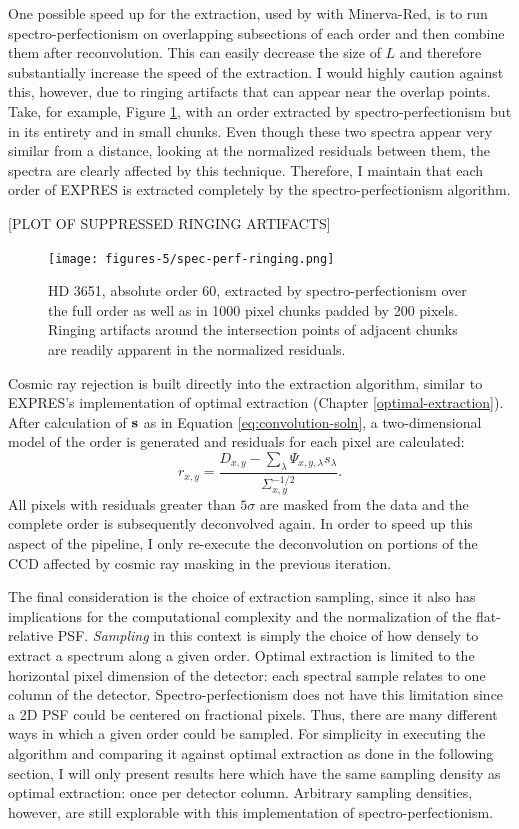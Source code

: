 One possible speed up for the extraction, used by \citet{cornachione_full_2019} with Minerva-Red, is to run spectro-perfectionism on overlapping subsections of each order and then combine them after reconvolution. This can easily decrease the size of $L$ and therefore substantially increase the speed of the extraction. I would highly caution against this, however, due to ringing artifacts that can appear near the overlap points. Take, for example, Figure \ref{fig:spec-perf-ringing}, with an order extracted by spectro-perfectionism but in its entirety and in small chunks. Even though these two spectra appear very similar from a distance, looking at the normalized residuals between them, the spectra are clearly affected by this technique. Therefore, I maintain that each order of EXPRES is extracted completely by the spectro-perfectionism algorithm.

[PLOT OF SUPPRESSED RINGING ARTIFACTS]
\begin{figure}[H]
    \centering
    \texttt{[image: figures-5/spec-perf-ringing.png]}
    \caption{HD 3651, absolute order 60, extracted by spectro-perfectionism over the full order as well as in 1000 pixel chunks padded by 200 pixels. Ringing artifacts around the intersection points of adjacent chunks are readily apparent in the normalized residuals.}
    \label{fig:spec-perf-ringing}
\end{figure}

Cosmic ray rejection is built directly into the extraction algorithm, similar to EXPRES's implementation of optimal extraction (Chapter \ref{optimal-extraction}). After calculation of $\vb{s}$ as in Equation \ref{eq:convolution-soln}, a two-dimensional model of the order is generated and residuals for each pixel are calculated:
\begin{equation}
    r_{x,y} = \frac{D_{x,y} - \sum_\lambda{\Psi_{x,y,\lambda}s_\lambda}} {\Sigma_{x,y}^{-1/2}}.
    \label{eq:spec-perf-resid}
\end{equation}
All pixels with residuals greater than $5\sigma$ are masked from the data and the complete order is subsequently deconvolved again. In order to speed up this aspect of the pipeline, I only re-execute the deconvolution on portions of the CCD affected by cosmic ray masking in the previous iteration.

The final consideration is the choice of extraction sampling, since it also has implications for the computational complexity and the normalization of the flat-relative PSF. \textit{Sampling} in this context is simply the choice of how densely to extract a spectrum along a given order. Optimal extraction is limited to the horizontal pixel dimension of the detector: each spectral sample relates to one column of the detector. Spectro-perfectionism does not have this limitation since a 2D PSF could be centered on fractional pixels. Thus, there are many different ways in which a given order could be sampled. For simplicity in executing the algorithm and comparing it against optimal extraction as done in the following section, I will only present results here which have the same sampling density as optimal extraction: once per detector column. Arbitrary sampling densities, however, are still explorable with this implementation of spectro-perfectionism.

